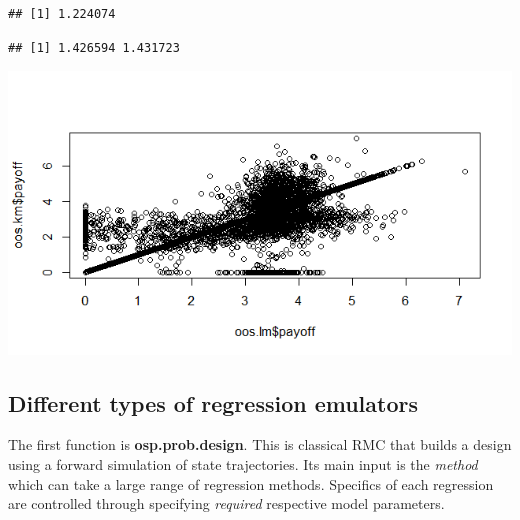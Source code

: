 \documentclass[]{article}
\newenvironment{Shaded}{\begin{snugshade}}{\end{snugshade}}
\newcommand{\KeywordTok}[1]{\textcolor[rgb]{0.13,0.29,0.53}{\textbf{#1}}}
\newcommand{\StringTok}[1]{\textcolor[rgb]{0.31,0.60,0.02}{#1}}
\newcommand{\OperatorTok}[1]{\textcolor[rgb]{0.81,0.36,0.00}{\textbf{#1}}}
\newcommand{\NormalTok}[1]{#1}
\begin{document}
\begin{verbatim}
## [1] 1.224074
\end{verbatim}

\begin{Shaded}
\end{Shaded}

\begin{verbatim}
## [1] 1.426594 1.431723
\end{verbatim}

\begin{Shaded}
\end{Shaded}

\includegraphics{figures/unnamed-chunk-2-1.png}

\subsection{Different types of regression
emulators}\label{different-types-of-regression-emulators}

The first function is \textbf{osp.prob.design}. This is classical RMC
that builds a design using a forward simulation of state trajectories.
Its main input is the \emph{method} which can take a large range of
regression methods. Specifics of each regression are controlled through
specifying \emph{required} respective model parameters.
\end{document}

